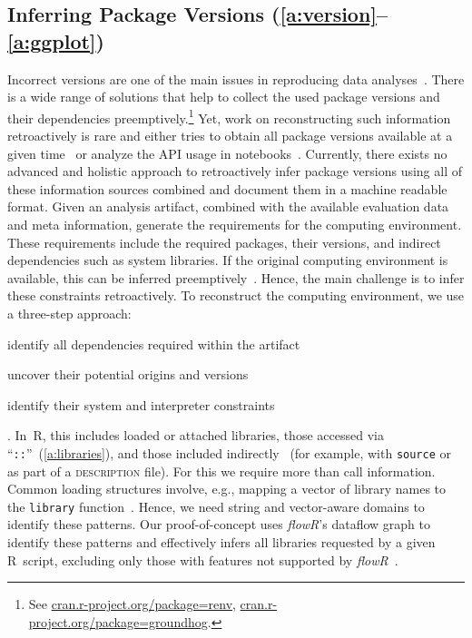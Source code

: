 \subsection[Inferring Package Versions]{Inferring Package Versions (\ref{a:version}--\ref{a:ggplot})}\label{sec:package-versions}
Incorrect versions are one of the main issues in reproducing data analyses~\cite{DBLP:journals/corr/abs-2303-04758}. There is a wide range of solutions that help to collect the used package versions and their dependencies preemptively.\footnote{See \href{https://cran.r-project.org/package=renv}{cran.r-project.org/package=renv}, \href{https://cran.r-project.org/package=groundhog}{cran.r-project.org/package=groundhog}.} Yet, work on reconstructing
such information retroactively is rare and either tries to obtain all package versions available at a given time~\cite{DBLP:journals/corr/abs-2303-04758} or analyze the API usage in notebooks~\cite{DBLP:conf/icse/WangLZ21}.  %
Currently, there exists no advanced and holistic approach to retroactively infer package versions using all of these information sources combined and document them in a machine readable format.
Given an analysis artifact, combined with the available evaluation data and meta information, generate the requirements for the computing environment. These requirements include the required packages, their versions, and indirect dependencies such as system libraries.
If the original computing environment is available, this can be inferred preemptively~\cite{donat2025r4r}.
Hence, the main challenge is to infer these constraints retroactively.
To reconstruct the computing environment, we use a three-step approach: 
\begin{inlist}[itemjoin*={{, as well as }}]
  \item identify all dependencies required within the artifact
  \item uncover their potential origins and versions
  \item identify their system and interpreter constraints
\end{inlist}.
In~R, this includes loaded or attached libraries, those accessed via \enquote{\texttt{::}}~(\ref{a:libraries}), and those included indirectly~\cite{DBLP:journals/corr/abs-2303-04758} (for example, with \texttt{source} or as part of a \textsc{description} file).
For this we require more than call information. Common loading structures involve, e.g., mapping a vector of library names to the \texttt{library} function~\cite{DBLP:conf/msr/SihlerPSTDD24}. Hence, we need string and vector-aware domains to identify these patterns. Our proof-of-concept uses \textit{flowR}'s dataflow graph to identify these patterns and effectively infers all libraries requested by a given R~script, excluding only those with features not supported by \textit{flowR}~\cite{floopsla}. 
